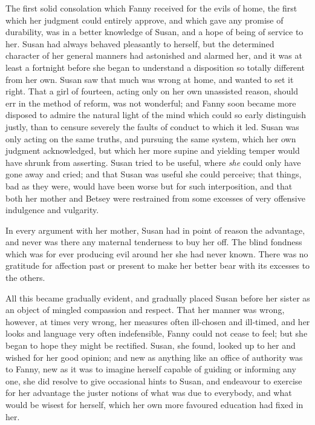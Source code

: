 \documentclass{article}
\begin{document}
The first solid consolation which Fanny received for
the evils of home, the first which her judgment could
entirely approve, and which gave any promise of durability,
was in a better knowledge of Susan, and a hope of being
of service to her.  Susan had always behaved pleasantly
to herself, but the determined character of her general
manners had astonished and alarmed her, and it was at least
a fortnight before she began to understand a disposition
so totally different from her own.  Susan saw that much
was wrong at home, and wanted to set it right.  That a girl
of fourteen, acting only on her own unassisted reason,
should err in the method of reform, was not wonderful;
and Fanny soon became more disposed to admire the natural
light of the mind which could so early distinguish justly,
than to censure severely the faults of conduct to which it led.
Susan was only acting on the same truths, and pursuing
the same system, which her own judgment acknowledged,
but which her more supine and yielding temper would
have shrunk from asserting.  Susan tried to be useful,
where \emph{she} could only have gone away and cried; and that
Susan was useful she could perceive; that things, bad as
they were, would have been worse but for such interposition,
and that both her mother and Betsey were restrained from
some excesses of very offensive indulgence and vulgarity.

In every argument with her mother, Susan had in point
of reason the advantage, and never was there any maternal
tenderness to buy her off.  The blind fondness which was
for ever producing evil around her she had never known.
There was no gratitude for affection past or present
to make her better bear with its excesses to the others.

All this became gradually evident, and gradually placed
Susan before her sister as an object of mingled compassion
and respect.  That her manner was wrong, however, at times
very wrong, her measures often ill-chosen and ill-timed,
and her looks and language very often indefensible,
Fanny could not cease to feel; but she began to hope they
might be rectified.  Susan, she found, looked up to her
and wished for her good opinion; and new as anything like an
office of authority was to Fanny, new as it was to imagine
herself capable of guiding or informing any one, she did
resolve to give occasional hints to Susan, and endeavour
to exercise for her advantage the juster notions of what was
due to everybody, and what would be wisest for herself,
which her own more favoured education had fixed in her.
\end{document}
